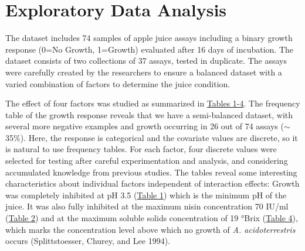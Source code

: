 \documentclass[
  12pt,
]{article}
\begin{document}
\hypertarget{exploratory-data-analysis}{%
\section{Exploratory Data Analysis}\label{exploratory-data-analysis}}

The dataset includes 74 samples of apple juice assays including a binary
growth response (0=No Growth, 1=Growth) evaluated after 16 days of
incubation. The dataset consists of two collections of 37 assays, tested
in duplicate. The assays were carefully created by the researchers to
ensure a balanced dataset with a varied combination of factors to
determine the juice condition.

The effect of four factors was studied as summarized in
\hyperref[table1:ph]{Tables 1-4}. The frequency table of the growth
response reveals that we have a semi-balanced dataset, with several more
negative examples and growth occurring in 26 out of 74 assays (\(\sim\)
35\%). Here, the response is categorical and the covariate values are
discrete, so it is natural to use frequency tables. For each factor,
four discrete values were selected for testing after careful
experimentation and analysis, and considering accumulated knowledge from
previous studies. The tables reveal some interesting characteristics
about individual factors independent of interaction effects: Growth was
completely inhibited at pH 3.5 (\hyperref[table1:ph]{Table 1}) which is
the minimum pH of the juice. It was also fully inhibited at the maximum
nisin concentration 70 IU/ml (\hyperref[table2:nisin]{Table 2}) and at
the maximum soluble solids concentration of 19 °Brix
(\hyperref[table4:brix]{Table 4}), which marks the concentration level
above which no growth of \emph{A. acidoterrestris} occurs
(Splittstoesser, Churey, and Lee 1994).
\end{document}
